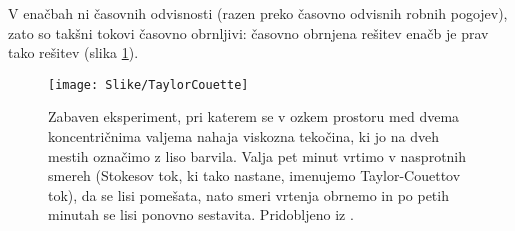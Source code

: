\setlength{\textheight}{26.4cm}
\pagebreak
\setlength{\topmargin}{1.6cm}			%
\setlength{\headheight}{0.0cm}
\setlength{\headsep}{0.0cm}			%
\fancyhf{}
\fancyfoot[C]{\thepage}

V enačbah ni časovnih odvisnosti (razen preko časovno odvisnih robnih pogojev), zato so takšni tokovi časovno obrnljivi: časovno obrnjena rešitev enačb je prav tako rešitev (slika \ref{fig:TaylorCouette}).

\begin{figure}[!ht]
	\texttt{[image: Slike/TaylorCouette]}
	\caption{Zabaven eksperiment, pri katerem se v ozkem prostoru med dvema koncentričnima valjema nahaja viskozna tekočina, ki jo na dveh mestih označimo z liso barvila. Valja pet minut vrtimo v nasprotnih smereh (Stokesov tok, ki tako nastane, imenujemo Taylor-Couettov tok), da se lisi pomešata, nato smeri vrtenja obrnemo in po petih minutah se lisi ponovno sestavita. Pridobljeno iz  \cite{Wiki-StokesFlow}.}
	\label{fig:TaylorCouette}
\end{figure}

